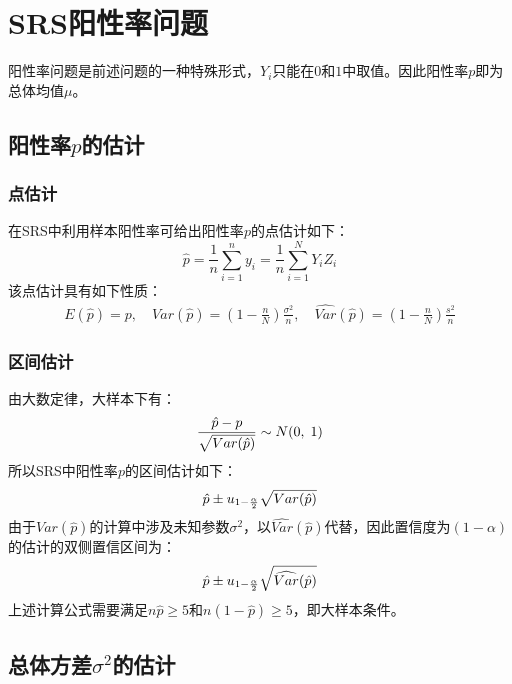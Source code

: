 \section{SRS阳性率问题}
阳性率问题是前述问题的一种特殊形式，$Y_i$只能在$0$和$1$中取值。因此阳性率$p$即为总体均值$\mu$。
\subsection{阳性率$p$的估计}
\subsubsection{点估计}
\begin{definition}
	在SRS中利用样本阳性率可给出阳性率$p$的点估计如下：
	\begin{equation*}
		\hat{p}=\frac{1}{n}\sum\limits_{i=1}^{n}y_i=\frac{1}{n}\sum\limits_{i=1}^{N}Y_iZ_i
	\end{equation*}
	该点估计具有如下性质：
	\begin{gather*}
		E(\hat{p})=p,\quad
		Var(\hat{p})=\left(1-\frac{n}{N}\right)\frac{\sigma^2}{n},\quad
		\widehat{Var}(\hat{p})=\left(1-\frac{n}{N}\right)\frac{s^2}{n}
	\end{gather*}
\end{definition}

\subsubsection{区间估计}
\begin{theorem}
	由大数定律，大样本下有：
	\begin{equation}
		\frac{\hat{p}-p}{\sqrt{Var(\hat{p})}}\sim N(0,\;1)\notag
	\end{equation}
	所以SRS中阳性率$p$的区间估计如下：
	\begin{equation}
		\hat{p}\pm u_{1-\frac{\alpha}{2}}\sqrt{Var(\hat{p})}\notag
	\end{equation}
	由于$Var(\hat{p})$的计算中涉及未知参数$\sigma^2$，以$\widehat{Var}(\hat{p})$代替，因此置信度为$(1-\alpha)$的估计的双侧置信区间为：
	\begin{equation}
		\hat{p}\pm u_{1-\frac{\alpha}{2}}\sqrt{\widehat{Var}(\hat{p})}\notag
	\end{equation}
	上述计算公式需要满足$n\hat{p}\geqslant5$和$n(1-\hat{p})\geqslant 5$，即大样本条件。
\end{theorem}

\subsection{总体方差$\sigma^2$的估计}
